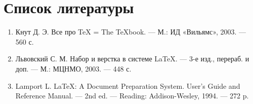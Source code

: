 \documentclass[14pt]{extreport}
\begin{document}
\newpage
\chapter*{Список литературы}

\begin{enumerate}
    \item Кнут Д. Э. Все про \TeX{} = The \TeX{}book. --- М.: ИД «Вильямс», 2003. --- 560 с.
    \item Львовский С. М. Набор и верстка в системе \LaTeX{}. --- 3-е изд., перераб. и доп. --- М.: МЦНМО, 2003. --- 448 с.
    \item Lamport L. \LaTeX{}: A Document Preparation System. User's Guide and Reference Manual. --- 2nd ed. --- Reading: Addison-Wesley, 1994. --- 272 p.
\end{enumerate}
\end{document}
